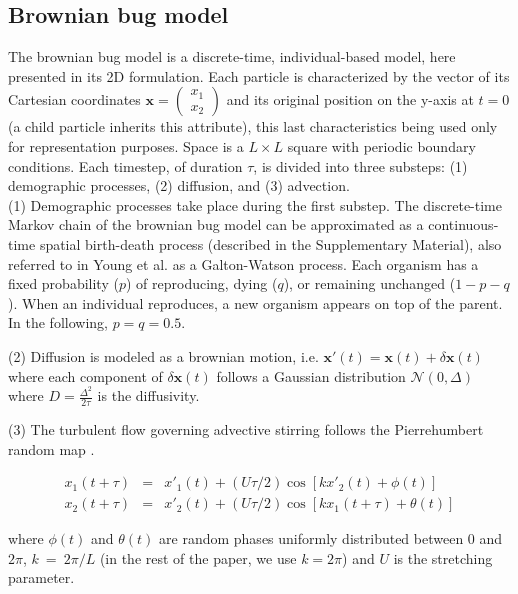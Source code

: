 \subsection*{Brownian bug model}
The brownian bug model is a discrete-time, individual-based model, here presented in its 2D formulation. Each particle is characterized by the vector of its Cartesian coordinates $\boldsymbol{x}=\begin{pmatrix} 
      x_1\\ 
      x_2 
\end{pmatrix}$ and its original position on the y-axis at $t=0$ (a child particle inherits this attribute), this last characteristics being used only for representation purposes. Space is a $L\times L$ square with periodic boundary conditions. Each timestep, of duration $\tau$, is divided into three substeps: (1) demographic processes, (2) diffusion, and (3) advection. \\

(1) Demographic processes take place during the first substep. The discrete-time Markov chain of the brownian bug model can be approximated as a continuous-time spatial birth-death process (described in the Supplementary Material), also referred to in Young et al. \cite{young_reproductive_2001} as a Galton-Watson process. Each organism has a fixed probability ($p$) of reproducing, dying ($q$), or remaining unchanged ($1-p-q$). When an individual reproduces, a new organism appears on top of the parent. In the following, $p=q=0.5$.

(2) Diffusion is modeled as a brownian motion, i.e. $\boldsymbol{x'}(t)=\boldsymbol{x}(t)+\delta\boldsymbol{x}(t)$ where each component of $\delta\boldsymbol{x}(t)$ follows a Gaussian distribution $\mathcal{N}(0,\Delta)$ where $D=\frac{\Delta^2}{2\tau}$ is the diffusivity. 

(3) The turbulent flow governing advective stirring follows the Pierrehumbert random map \citep{pierrehumbert_tracer_1994}.

\begin{eqnarray}
 x_1(t+\tau)&=&x'_1(t)+(U\tau/2)\cos[kx'_2(t)+\phi(t)]\\
 x_2(t+\tau)&=&x'_2(t)+(U\tau/2)\cos[kx_1(t+\tau)+\theta(t)]
 \label{eq:pierrehumbert}
 \end{eqnarray}

 where $\phi(t)$ and $\theta(t)$ are random phases uniformly distributed between 0 and $2\pi$, $k~=~2\pi/L$ (in the rest of the paper, we use $k=2\pi$) and $U$ is the stretching parameter. \\
 

